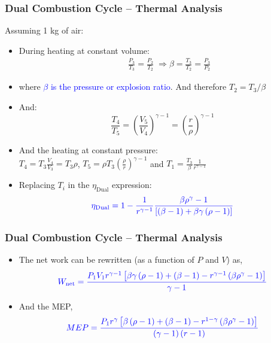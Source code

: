 \documentclass[10pt,compress]{beamer}
\newcommand{\frc}{\displaystyle\frac}
\begin{document}
\begin{frame}
 \frametitle{Dual Combustion Cycle --  Thermal Analysis}
   Assuming 1 kg of air: 
    \begin{itemize}
     \item <1-> During heating at constant volume:
      \begin{eqnarray}
        &&\displaystyle\frac{P_{3}}{T_{3}}=\displaystyle\frac{P_{2}}{T_{2}}\;\Rightarrow \beta=\displaystyle\frac{T_{3}}{T_{2}}=\displaystyle\frac{P_{3}}{P_{2}} \nonumber 
      \end{eqnarray}
     \item <2-> where \textcolor{blue}{$\beta$ is the pressure or explosion ratio}. And therefore $T_{2}=T_{3}/\beta$
     \item <3-> And:
      \begin{displaymath}
       \displaystyle\frac{T_{4}}{T_{5}}=\left(\displaystyle\frac{V_{5}}{V_{4}}\right)^{\gamma-1}=\left(\frc{r}{\rho}\right)^{\gamma-1}
      \end{displaymath}
     \item <4-> And the heating at constant pressure: \\
 $T_{4}=T_{3}\frc{V_{4}}{V_{3}}=T_{3}\rho$, $T_{5}=\rho T_{3}\left(\frc{\rho}{r}\right)^{\gamma-1}$ and $T_{1}=\frc{T_{3}}{\beta}\frc{1}{r^{\gamma-1}}$
     \item <5-> Replacing $T_{i}$ in the $\eta_{\text{Dual}}$ expression:
     \begin{displaymath}
      \textcolor{blue}{\eta_{\text{Dual}} = 1 - \frc{1}{r^{\gamma-1}}\frc{\beta \rho^{\gamma}-1}{\left[\left(\beta-1\right)+\beta\gamma\left(\rho-1\right)\right]}}
     \end{displaymath}
    \end{itemize}
\end{frame}


\begin{frame}
 \frametitle{Dual Combustion Cycle --  Thermal Analysis}
    \begin{itemize}
     \item <1-> The net work can be rewritten (as a function of $P$ and $V$) as,
      \begin{displaymath}
       \textcolor{blue}{W_{\text{net}}= \frc{P_{1}V_{1}r^{\gamma-1}\left[\beta\gamma \left(\rho-1\right)+\left(\beta-1\right)-r^{\gamma-1}\left(\beta\rho^{\gamma}-1\right)\right]}{\gamma-1}}
      \end{displaymath}
      \item <2-> And the MEP,
       \begin{displaymath}
        \textcolor{blue}{MEP = \frc{P_{1} r^{\gamma}\left[\beta\left(\rho-1\right)+\left(\beta-1\right)-r^{1-\gamma}\left(\beta\rho^{\gamma}-1\right)\right]}{\left(\gamma-1\right)\left(r-1\right)}}
       \end{displaymath}
    \end{itemize}
\end{frame}
\end{document}
